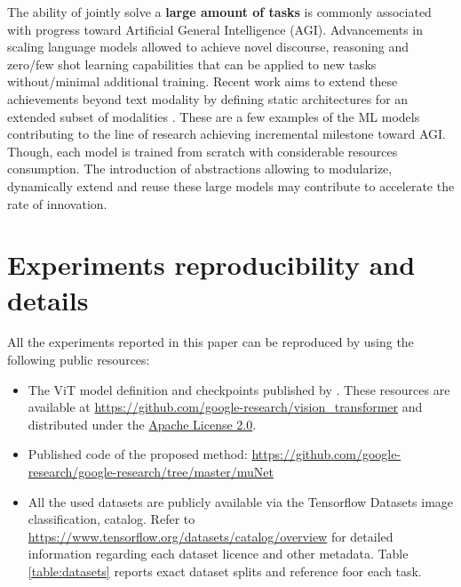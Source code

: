 \documentclass{article} \usepackage{iclr2023_conference,times}
\begin{document}
The ability of jointly solve a \textbf{large amount of tasks} is commonly associated with progress toward Artificial General Intelligence (AGI).
Advancements in scaling language models \citep{Brown2020LanguageMA,Thoppilan2022LaMDALM} allowed to achieve novel discourse, reasoning and zero/few shot learning capabilities that can be applied to new tasks without/minimal additional training.
Recent work aims to extend these achievements beyond text modality by defining static architectures for an extended subset of modalities \citep{Alayrac2022FlamingoAV,Reed2022AGA}.
These are a few examples of the ML models contributing to the line of research achieving incremental milestone toward AGI. Though, each model is trained from scratch with considerable resources consumption.
The introduction of abstractions allowing to modularize, dynamically extend and reuse these large models may contribute to accelerate the rate of innovation. 









\section{Experiments reproducibility and details}
\label{section:repro}
All the experiments reported in this paper can be reproduced by using the following public resources:
\begin{itemize}
    \item 
The ViT model definition and checkpoints published by \citet{Steiner2021HowTT}.
These resources are available at  \href{https://github.com/google-research/vision_transformer}{https://github.com/google-research/vision\_transformer} and distributed under the \href{https://github.com/google-research/vision_transformer/blob/main/LICENSE}{Apache License 2.0}.

\item Published code of the proposed method: 
\href{https://github.com/google-research/google-research/tree/master/muNet}{https://github.com/google-research/google-research/tree/master/muNet}
\item All the used datasets are publicly available via the Tensorflow Datasets image classification,  catalog.
Refer to \href{https://www.tensorflow.org/datasets/catalog/overview}{https://www.tensorflow.org/datasets/catalog/overview} for detailed information regarding each dataset licence and other metadata.
Table \ref{table:datasets} reports exact dataset splits and reference foor each task.
\end{itemize}
\end{document}
